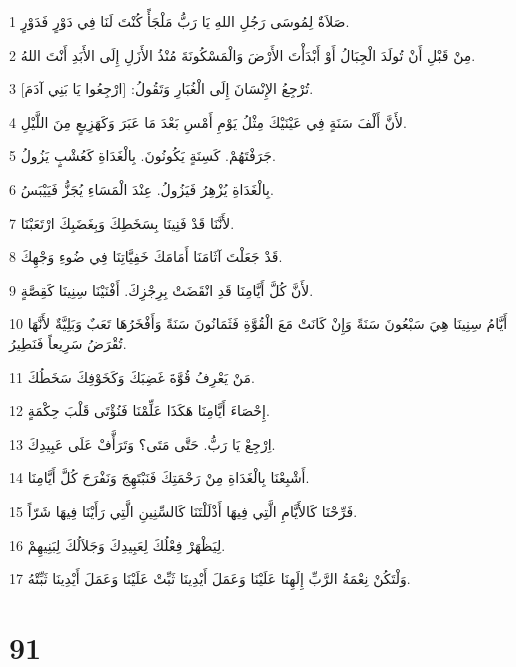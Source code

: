 \par 1 صَلاَةٌ لِمُوسَى رَجُلِ اللهِ يَا رَبُّ مَلْجَأً كُنْتَ لَنَا فِي دَوْرٍ فَدَوْرٍ.
\par 2 مِنْ قَبْلِ أَنْ تُولَدَ الْجِبَالُ أَوْ أَبْدَأْتَ الأَرْضَ وَالْمَسْكُونَةَ مُنْذُ الأَزَلِ إِلَى الأَبَدِ أَنْتَ اللهُ.
\par 3 تُرْجِعُ الإِنْسَانَ إِلَى الْغُبَارِ وَتَقُولُ: [ارْجِعُوا يَا بَنِي آدَمَ].
\par 4 لأَنَّ أَلْفَ سَنَةٍ فِي عَيْنَيْكَ مِثْلُ يَوْمِ أَمْسِ بَعْدَ مَا عَبَرَ وَكَهَزِيعٍ مِنَ اللَّيْلِ.
\par 5 جَرَفْتَهُمْ. كَسِنَةٍ يَكُونُونَ. بِالْغَدَاةِ كَعُشْبٍ يَزُولُ.
\par 6 بِالْغَدَاةِ يُزْهِرُ فَيَزُولُ. عِنْدَ الْمَسَاءِ يُجَزُّ فَيَيْبَسُ.
\par 7 لأَنَّنَا قَدْ فَنِينَا بِسَخَطِكَ وَبِغَضَبِكَ ارْتَعَبْنَا.
\par 8 قَدْ جَعَلْتَ آثَامَنَا أَمَامَكَ خَفِيَّاتِنَا فِي ضُوءِ وَجْهِكَ.
\par 9 لأَنَّ كُلَّ أَيَّامِنَا قَدِ انْقَضَتْ بِرِجْزِكَ. أَفْنَيْنَا سِنِينَا كَقِصَّةٍ.
\par 10 أَيَّامُ سِنِينَا هِيَ سَبْعُونَ سَنَةً وَإِنْ كَانَتْ مَعَ الْقُوَّةِ فَثَمَانُونَ سَنَةً وَأَفْخَرُهَا تَعَبٌ وَبَلِيَّةٌ لأَنَّهَا تُقْرَضُ سَرِيعاً فَنَطِيرُ.
\par 11 مَنْ يَعْرِفُ قُوَّةَ غَضِبَكَ وَكَخَوْفِكَ سَخَطُكَ.
\par 12 إِحْصَاءَ أَيَّامِنَا هَكَذَا عَلِّمْنَا فَنُؤْتَى قَلْبَ حِكْمَةٍ.
\par 13 اِرْجِعْ يَا رَبُّ. حَتَّى مَتَى؟ وَتَرَأَّفْ عَلَى عَبِيدِكَ.
\par 14 أَشْبِعْنَا بِالْغَدَاةِ مِنْ رَحْمَتِكَ فَنَبْتَهِجَ وَنَفْرَحَ كُلَّ أَيَّامِنَا.
\par 15 فَرِّحْنَا كَالأَيَّامِ الَّتِي فِيهَا أَذْلَلْتَنَا كَالسِّنِينِ الَّتِي رَأَيْنَا فِيهَا شَرّاً.
\par 16 لِيَظْهَرْ فِعْلُكَ لِعَبِيدِكَ وَجَلاَلُكَ لِبَنِيهِمْ.
\par 17 وَلْتَكُنْ نِعْمَةُ الرَّبِّ إِلَهِنَا عَلَيْنَا وَعَمَلَ أَيْدِينَا ثَبِّتْ عَلَيْنَا وَعَمَلَ أَيْدِينَا ثَبِّتْهُ.

\chapter{91}

